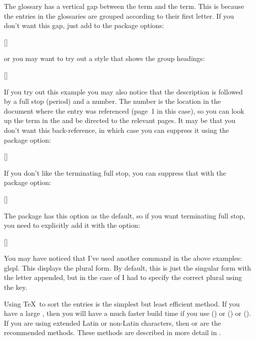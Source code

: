 \documentclass[titlepage=false,oneside,
 fontsize=12pt,captions=tableheading]{scrarticle}
\begin{document}
The glossary has a vertical gap between the  term and the
 term. This is because the entries in the glossaries are
grouped according to their first letter. If you don't want this gap,
just add  to the package options:
\begin{codebox}
[]
\end{codebox}
or you may want to try out a style that shows the group headings:
\begin{codebox*}
[]
\end{codebox*}
If you try out this example you may also notice that the description
is followed by a full stop (period) and a number. The number is the
location in the document where the entry was referenced (page~1 in this
case), so you can look up the term in the  and be directed to
the relevant pages. It may be that you don't want this
back-reference, in which case you can suppress it using the
 package option:
\begin{codebox}
[]
\end{codebox}
If you don't like the terminating full stop, you can suppress that
with the  package option:
\begin{codebox}
[]
\end{codebox}
The  package has this option as the default,
so if you want terminating full stop, you need to explicitly add it
with the  option:
\begin{codebox}
[]
\end{codebox}

You may have noticed that I've used another command in the above examples:
\gls{glspl}. This displays the plural form. By default, this is just
the singular form with the letter  appended, but in the case of
 I had to specify the correct plural using the
 key.

Using \TeX\ to sort the entries is the simplest but least efficient
method. If you have a large , then you will have a
much faster build time if you use  ()
or  () or  (). If
you are using extended Latin or non-Latin characters, then
 or  are the recommended methods.  These
methods are described in more detail in
.
\end{document}
